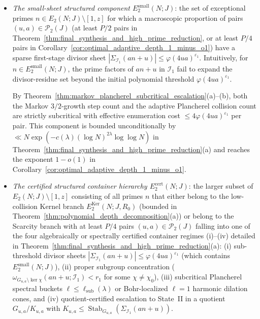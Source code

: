 \documentclass[11pt, a4paper]{article}
\theoremstyle{plain}
\theoremstyle{definition}
\begin{document}
\begin{itemize}
    \item \emph{The small-sheet structured component $E_2^{\mathrm{small}}(N;J)$}: 
    the set of exceptional primes $n\in E_2(N;J)\setminus[1,z]$ for which a macroscopic proportion of pairs $(u,a)\in\mathcal{P}_2(J)$ (at least $P/2$ pairs in Theorem~\ref{thm:final_synthesis_and_high_prime_reduction}, or at least $P/4$ pairs in Corollary~\ref{cor:optimal_adaptive_depth_1_minus_o1}) have a sparse first-stage divisor sheet $|\Sigma_{\mathcal{I}_1}(an+u)|\le\varphi(4ua)^{\varepsilon_1}$. Intuitively, for $n\in E_2^{\mathrm{small}}(N;J)$, the prime factors of $an+u$ in $\mathcal{I}_1$ fail to expand the divisor-residue set beyond the initial polynomial threshold $\varphi(4ua)^{\varepsilon_1}$. 
    
    By Theorem~\ref{thm:markov_plancherel_subcritical_escalation}(a)--(b), both the Markov $3/2$-growth step count and the adaptive Plancherel collision count are strictly subcritical with effective enumeration cost $\le 4\varphi(4ua)^{\varepsilon_1}$ per pair. This component is bounded unconditionally by $\ll N\exp(-c(\lambda)(\log N)^{2\lambda}\log\log N)$ in Theorem~\ref{thm:final_synthesis_and_high_prime_reduction}(a) and reaches the exponent $1-o(1)$ in Corollary~\ref{cor:optimal_adaptive_depth_1_minus_o1}.
    
    \item \emph{The certified structured container hierarchy $E_2^{\mathrm{cert}}(N;J)$}: 
    the larger subset of $E_2(N;J)\setminus[1,z]$ consisting of all primes $n$ that either belong to the low-collision Kernel branch $E_2^{\mathrm{Ker}}(N;J,R_0)$ (bounded in Theorem~\ref{thm:polynomial_depth_decomposition}(a)) or belong to the Scarcity branch with at least $P/4$ pairs $(u,a)\in\mathcal{P}_2(J)$ falling into one of the four algebraically or spectrally certified container regimes (i)--(iv) detailed in Theorem~\ref{thm:final_synthesis_and_high_prime_reduction}(a): (i) sub-threshold divisor sheets $|\Sigma_{\mathcal{I}_1}(an+u)|\le\varphi(4ua)^{\varepsilon_1}$ (which contains $E_2^{\mathrm{small}}(N;J)$), (ii) proper subgroup concentration ($\omega_{G_{u,a}\setminus\ker\chi}(an+u;\mathcal{I}_1)<r_1$ for some $\chi\neq\chi_0$), (iii) subcritical Plancherel spectral buckets $\ell\le\ell_{\mathrm{sub}}(\lambda)$ or Bohr-localized $\ell=1$ harmonic dilation cones, and (iv) quotient-certified escalation to State~II in a quotient $G_{u,a}/K_{u,a}$ with $K_{u,a}\le\operatorname{Stab}_{G_{u,a}}(\Sigma_{\mathcal{I}_1}(an+u))$. 
    

\end{itemize}
\end{document}
